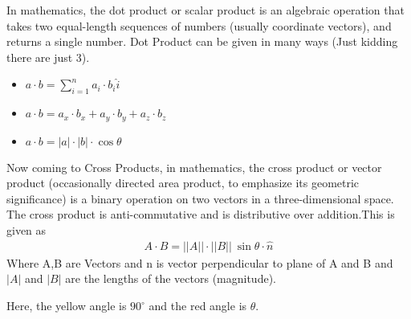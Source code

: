 \begin{phybox}{}
{In mathematics, the dot product or scalar product is an algebraic operation that takes two equal-length sequences of numbers (usually coordinate vectors), and returns a single number. Dot Product can be given in many ways (Just kidding there are just 3).
\begin{itemize}
    \item{$a \cdot b = \displaystyle \sum^{n}_{i=1}  a_i \cdot b_i  \hat{i}$}
    \item{$a \cdot b = a_x \cdot b_x + a_y \cdot b_y + a_z \cdot b_z$}
    \item{$a \cdot b = |a| \cdot |b| \cdot \cos \theta$}
\end{itemize}

Now coming to Cross Products, in mathematics, the cross product or vector product (occasionally directed area product, to emphasize its geometric significance) is a binary operation on two vectors in a three-dimensional space. The cross product is anti-commutative and is distributive over addition.This is given as
\begin{align*}
    A \cdot B = ||A|| \cdot ||B||~\sin \theta \cdot \hat{n}
\end{align*}
Where A,B are Vectors and n is vector perpendicular to plane of A and B and $|A|$ and $|B|$ are the lengths of the vectors (magnitude).\\
\begin{center}
\end{center}
Here, the yellow angle is $90^{\circ}$ and the red angle is $\theta$.}
\end{phybox}
